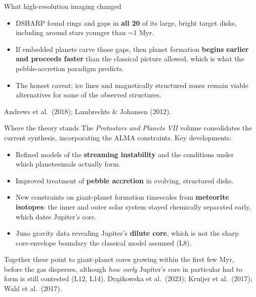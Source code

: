 \documentclass[aspectratio=169, 11pt]{beamer}
\begin{document}
\begin{frame}{What high-resolution imaging changed}
  \begin{itemize}
    \item DSHARP found rings and gaps in \textbf{all 20} of its large, bright target disks, including around stars younger than $\sim 1$ Myr.
    \item If embedded planets carve those gaps, then planet formation \textbf{begins earlier and proceeds faster} than the classical picture allowed, which is what the pebble-accretion paradigm predicts.
    \item The honest caveat: ice lines and magnetically structured zones remain viable alternatives for some of the observed structures.
  \end{itemize}
  \vskip6pt\relax
  \vskip2pt\relax
  {\footnotesize Andrews et al.\ (2018); Lambrechts \& Johansen (2012).}
\end{frame}

\begin{frame}{Where the theory stands}
  The \emph{Protostars and Planets VII} volume consolidates the current synthesis, incorporating the ALMA constraints. Key developments:
  \vskip6pt\relax
  \begin{itemize}
    \item Refined models of the \textbf{streaming instability} and the conditions under which planetesimals actually form.
    \item Improved treatment of \textbf{pebble accretion} in evolving, structured disks.
    \item New constraints on giant-planet formation timescales from \textbf{meteorite isotopes}: the inner and outer solar system stayed chemically separated early, which dates Jupiter's core.
    \item Juno gravity data revealing Jupiter's \textbf{dilute core}, which is not the sharp core-envelope boundary the classical model assumed (L8).
  \end{itemize}
  \vskip6pt\relax
  Together these point to giant-planet cores growing within the first few Myr, before the gas disperses, although \emph{how early} Jupiter's core in particular had to form is still contested (L12, L14).
  \vskip2pt\relax
  {\footnotesize Dr\k{a}\.zkowska et al.\ (2023); Kruijer et al.\ (2017); Wahl et al.\ (2017).}
\end{frame}
\end{document}
